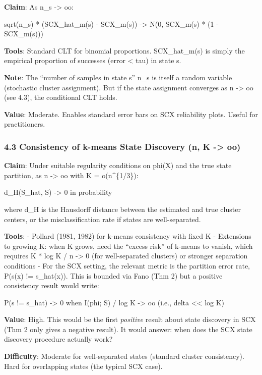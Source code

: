 \documentclass[
  12pt,
]{ctexart}
\begin{document}
\textbf{Claim}: As n\_s -\textgreater{} oo:

sqrt(n\_s) * (SCX\_hat\_m(s) - SCX\_m(s)) -\textgreater{} N(0, SCX\_m(s)
* (1 - SCX\_m(s)))

\textbf{Tools}: Standard CLT for binomial proportions. SCX\_hat\_m(s) is
simply the empirical proportion of successes (error \textless{} tau) in
state s.

\textbf{Note}: The ``number of samples in state s'' n\_s is itself a
random variable (stochastic cluster assignment). But if the state
assignment converges as n -\textgreater{} oo (see 4.3), the conditional
CLT holds.

\textbf{Value}: Moderate. Enables standard error bars on SCX reliability
plots. Useful for practitioners.

\subsubsection{4.3 Consistency of k-means State Discovery (n, K
-\textgreater{}
oo)}\label{consistency-of-k-means-state-discovery-n-k---oo}

\textbf{Claim}: Under suitable regularity conditions on phi(X) and the
true state partition, as n -\textgreater{} oo with K = o(n\^{}\{1/3\}):

d\_H(S\_hat, S) -\textgreater{} 0 in probability

where d\_H is the Hausdorff distance between the estimated and true
cluster centers, or the misclassification rate if states are
well-separated.

\textbf{Tools}: - Pollard (1981, 1982) for k-means consistency with
fixed K - Extensions to growing K: when K grows, need the ``excess
risk'' of k-means to vanish, which requires K * log K / n
-\textgreater{} 0 (for well-separated clusters) or stronger separation
conditions - For the SCX setting, the relevant metric is the partition
error rate, P(s(x) != s\_hat(x)). This is bounded via Fano (Thm 2) but a
positive consistency result would write:

P(s != s\_hat) -\textgreater{} 0 when I(phi; S) / log K -\textgreater{}
oo (i.e., delta \textless\textless{} log K)

\textbf{Value}: High. This would be the first \emph{positive} result
about state discovery in SCX (Thm 2 only gives a negative result). It
would answer: when does the SCX state discovery procedure actually work?

\textbf{Difficulty}: Moderate for well-separated states (standard
cluster consistency). Hard for overlapping states (the typical SCX
case).
\end{document}
